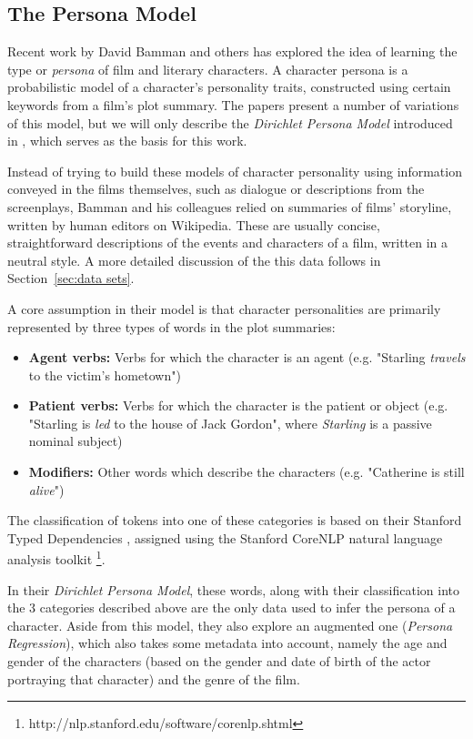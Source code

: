 \documentclass[bsc,frontabs,singlespacing,parskip]{infthesis} %
\begin{document}
\subsection{The Persona Model}
\label{sec:bg_persona}
Recent work by David Bamman and others has explored the idea of learning the type or \textit{persona} of film \cite{Bamman2013} and literary \cite{Bamman2014} characters. A character persona is a probabilistic model of a character's personality traits, constructed using certain keywords from a film's plot summary. The papers present a number of variations of this model, but we will only describe the \textit{Dirichlet Persona Model} introduced in \cite{Bamman2013}, which serves as the basis for this work.

Instead of trying to build these models of character personality using information conveyed in the films themselves, such as dialogue or descriptions from the screenplays, Bamman and his colleagues relied on summaries of films' storyline, written by human editors on Wikipedia. These are usually concise, straightforward descriptions of the events and characters of a film, written in a neutral style. A more detailed discussion of the this data follows in Section~\ref{sec:data sets}. 

A core assumption in their model is that character personalities are primarily represented by three types of words in the plot summaries:
\begin{itemize}
	\item \textbf{Agent verbs:} Verbs for which the character is an agent (e.g. "Starling \textit{travels} to the victim's hometown")
	\item \textbf{Patient verbs:} Verbs for which the character is the patient or object (e.g. "Starling is \textit{led} to the house of Jack Gordon", where \textit{Starling} is a passive nominal subject)
	\item \textbf{Modifiers:} Other words which describe the characters (e.g. "Catherine is still \textit{alive}")
\end{itemize}
The classification of tokens into one of these categories is based on their Stanford Typed Dependencies \cite{de2008stanford}, assigned using the Stanford CoreNLP natural language analysis toolkit \footnote{http://nlp.stanford.edu/software/corenlp.shtml}.

In their \textit{Dirichlet Persona Model}, these words, along with their classification into the 3 categories described above are the only data used to infer the persona of a character. Aside from this model, they also explore an augmented one (\textit{Persona Regression}), which also takes some metadata into account, namely the age and gender of the characters (based on the gender and date of birth of the actor portraying that character) and the genre of the film.
\end{document}
